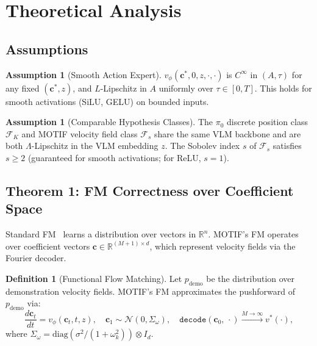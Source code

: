 \documentclass[11pt]{article}
\theoremstyle{plain}
\theoremstyle{definition}
\newtheorem{definition}[theorem]{Definition}
\newtheorem{assumption}[theorem]{Assumption}
\newcommand{\R}{\mathbb{R}}
\newcommand{\cN}{\mathcal{N}}
\newcommand{\vnet}{v_\phi}
\newcommand{\tdiff}{t}
\newcommand{\texec}{\tau}
\newcommand{\bz}{z}
\newcommand{\ccoeff}{\mathbf{c}}
\newcommand{\cclean}{\ccoeff^*}
\begin{document}
\section{Theoretical Analysis}
\label{sec:theory}

\subsection{Assumptions}

\begin{assumption}[Smooth Action Expert]
\label{asm:smooth}
$\vnet(\cclean, 0, \bz, \cdot, \cdot)$ is $C^\infty$ in $(A, \texec)$
for any fixed $(\cclean, \bz)$, and $L$-Lipschitz in $A$ uniformly
over $\texec \in [0,T]$.
This holds for smooth activations (SiLU, GELU) on bounded inputs.
\end{assumption}

\begin{assumption}[Comparable Hypothesis Classes]
\label{asm:hypothesis}
The $\pi_0$ discrete position class $\mathcal{F}_K$ and MOTIF velocity
field class $\mathcal{F}_s$ share the same VLM backbone and are both
$\Lambda$-Lipschitz in the VLM embedding $\bz$.
The Sobolev index $s$ of $\mathcal{F}_s$ satisfies $s \geq 2$
(guaranteed for smooth activations; for ReLU, $s=1$).
\end{assumption}

\subsection{Theorem 1: FM Correctness over Coefficient Space}

Standard FM~\cite{lipman2022flow} learns a distribution over vectors in $\R^n$.
MOTIF's FM operates over coefficient vectors $\ccoeff \in \R^{(M+1)\times d}$,
which represent velocity fields via the Fourier decoder.

\begin{definition}[Functional Flow Matching]
\label{def:funcfm}
Let $p_{\mathrm{demo}}$ be the distribution over demonstration velocity
fields.
MOTIF's FM approximates the pushforward of $p_{\mathrm{demo}}$ via:
\begin{equation}
  \frac{d\ccoeff_\tdiff}{d\tdiff} = \vnet(\ccoeff_\tdiff, \tdiff, \bz),
  \quad
  \ccoeff_1 \sim \cN(0, \Sigma_\omega),
  \quad
  \texttt{decode}(\ccoeff_0,\,\cdot) \xrightarrow{M \to \infty} v^*(\cdot),
\end{equation}
where $\Sigma_\omega = \mathrm{diag}(\sigma^2/(1+\omega_k^2)) \otimes I_d$.
\end{definition}
\end{document}
